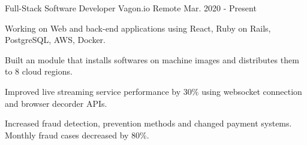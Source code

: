 
\begin{cventries}
  \cvopenentry
   {Full-Stack Software Developer
   } %
    {Vagon.io} %
    {Remote} %
    {Mar. 2020 - Present} %
    {
      \begin{cvitems} %
        \item {Working on Web and back-end applications using React, Ruby on Rails, PostgreSQL, AWS, Docker.}
        \item {Built an module that installs softwares on machine images and distributes them to 8 cloud regions.}
		\item {Improved live streaming service performance by 30\% using websocket connection and browser decorder APIs.}
		\item {Increased fraud detection, prevention methods and changed payment systems. Monthly fraud cases decreased by 80\%.}
      \end{cvitems}
    }


\end{cventries}
